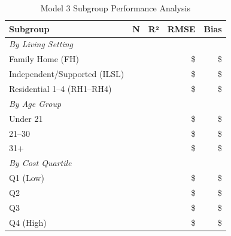 \begin{table}[h]
\centering
\caption{Model 3 Subgroup Performance Analysis}
\begin{tabular}{lrrrr}
\toprule
\textbf{Subgroup} & \textbf{N} & \textbf{R²} & \textbf{RMSE} & \textbf{Bias} \\
\midrule
\multicolumn{5}{l}{\textit{By Living Setting}} \\
Family Home (FH) & \ModelThreeSubgrouplivingFHN{} & \ModelThreeSubgrouplivingFHRSquared{} & \$\ModelThreeSubgrouplivingFHRMSE{} & \$\ModelThreeSubgrouplivingFHBias{} \\
Independent/Supported (ILSL) & \ModelThreeSubgrouplivingILSLN{} & \ModelThreeSubgrouplivingILSLRSquared{} & \$\ModelThreeSubgrouplivingILSLRMSE{} & \$\ModelThreeSubgrouplivingILSLBias{} \\
Residential 1--4 (RH1--RH4) & \ModelThreeSubgrouplivingRHOneToFourN{} & \ModelThreeSubgrouplivingRHOneToFourRSquared{} & \$\ModelThreeSubgrouplivingRHOneToFourRMSE{} & \$\ModelThreeSubgrouplivingRHOneToFourBias{} \\
\midrule
\multicolumn{5}{l}{\textit{By Age Group}} \\
Under 21 & \ModelThreeSubgroupageAgeUnderTwentyOneN{} & \ModelThreeSubgroupageAgeUnderTwentyOneRSquared{} & \$\ModelThreeSubgroupageAgeUnderTwentyOneRMSE{} & \$\ModelThreeSubgroupageAgeUnderTwentyOneBias{} \\
21--30 & \ModelThreeSubgroupageAgeTwentyOneToThirtyN{} & \ModelThreeSubgroupageAgeTwentyOneToThirtyRSquared{} & \$\ModelThreeSubgroupageAgeTwentyOneToThirtyRMSE{} & \$\ModelThreeSubgroupageAgeTwentyOneToThirtyBias{} \\
31+ & \ModelThreeSubgroupageAgeThirtyOnePlusN{} & \ModelThreeSubgroupageAgeThirtyOnePlusRSquared{} & \$\ModelThreeSubgroupageAgeThirtyOnePlusRMSE{} & \$\ModelThreeSubgroupageAgeThirtyOnePlusBias{} \\
\midrule
\multicolumn{5}{l}{\textit{By Cost Quartile}} \\
Q1 (Low) & \ModelThreeSubgroupcostQOneLowN{} & \ModelThreeSubgroupcostQOneLowRSquared{} & \$\ModelThreeSubgroupcostQOneLowRMSE{} & \$\ModelThreeSubgroupcostQOneLowBias{} \\
Q2 & \ModelThreeSubgroupcostQTwoN{} & \ModelThreeSubgroupcostQTwoRSquared{} & \$\ModelThreeSubgroupcostQTwoRMSE{} & \$\ModelThreeSubgroupcostQTwoBias{} \\
Q3 & \ModelThreeSubgroupcostQThreeN{} & \ModelThreeSubgroupcostQThreeRSquared{} & \$\ModelThreeSubgroupcostQThreeRMSE{} & \$\ModelThreeSubgroupcostQThreeBias{} \\
Q4 (High) & \ModelThreeSubgroupcostQFourHighN{} & \ModelThreeSubgroupcostQFourHighRSquared{} & \$\ModelThreeSubgroupcostQFourHighRMSE{} & \$\ModelThreeSubgroupcostQFourHighBias{} \\
\bottomrule
\end{tabular}
\end{table}

